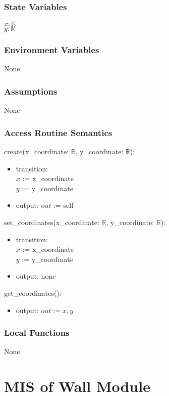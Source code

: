 \documentclass[12pt, titlepage]{article}
\begin{document}
\subsubsection{State Variables}
$x: \mathbb{R}$\\
$y: \mathbb{R}$
\subsubsection{Environment Variables} None

\subsubsection{Assumptions} None

\subsubsection{Access Routine Semantics}

\noindent create(x\_coordinate: $\mathbb{R}$, y\_coordinate: $\mathbb{R}$):
\begin{itemize}
\item transition: \\
$x$ := x\_coordinate\\
$y$ := y\_coordinate
\item output: $out$ := self
\end{itemize}

\noindent set\_coordinates(x\_coordinate: $\mathbb{R}$, y\_coordinate: $\mathbb{R}$):
\begin{itemize}
\item transition: \\
$x$ := x\_coordinate\\
$y$ := y\_coordinate
\item output: none
\end{itemize}

\noindent get\_coordinates():
\begin{itemize}
\item output: $out := x,y$
\end{itemize}

\subsubsection{Local Functions}
None

\newpage
\section{MIS of Wall Module} \label{wallModule}
\end{document}
